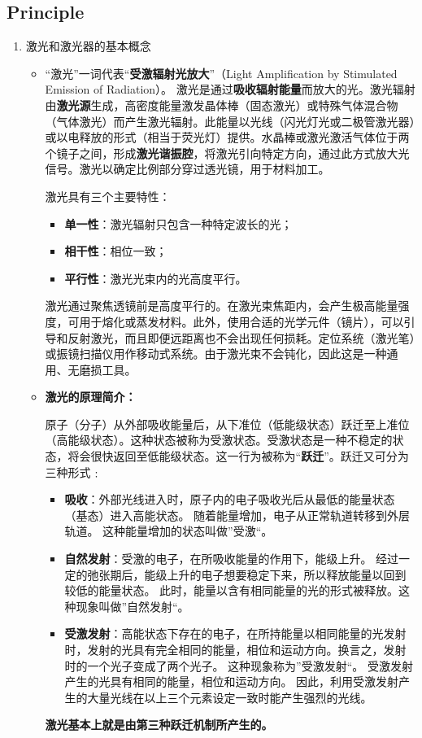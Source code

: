 \subsection{Principle}
\begin{enumerate}
	\item 激光和激光器的基本概念
	\begin{itemize}
		\item “激光”一词代表“\textbf{受激辐射光放大}”（Light Amplification by Stimulated Emission of Radiation）。   激光是通过\textbf{吸收辐射能量}而放大的光。激光辐射由\textbf{激光源}生成，高密度能量激发晶体棒（固态激光）或特殊气体混合物（气体激光）而产生激光辐射。此能量以光线（闪光灯光或二极管激光器）或以电释放的形式（相当于荧光灯）提供。水晶棒或激光激活气体位于两个镜子之间，形成\textbf{激光谐振腔}，将激光引向特定方向，通过此方式放大光信号。激光以确定比例部分穿过透光镜，用于材料加工。
		
		激光具有三个主要特性：
		\begin{itemize}
			\item \textbf{单一性}：激光辐射只包含一种特定波长的光；
			\item \textbf{相干性}：相位一致；
			\item \textbf{平行性}：激光光束内的光高度平行。
		\end{itemize}
		激光通过聚焦透镜前是高度平行的。在激光束焦距内，会产生极高能量强度，可用于熔化或蒸发材料。此外，使用合适的光学元件（镜片），可以引导和反射激光，而且即便远距离也不会出现任何损耗。定位系统（激光笔）或振镜扫描仪用作移动式系统。由于激光束不会钝化，因此这是一种通用、无磨损工具。
		
		\item \textbf{激光的原理简介：}
		
		原子（分子）从外部吸收能量后，从下准位（低能级状态）跃迁至上准位（高能级状态）。这种状态被称为受激状态。受激状态是一种不稳定的状态，将会很快返回至低能级状态。这一行为被称为“\textbf{跃迁}”。跃迁又可分为三种形式﹕
		\begin{itemize}
			\item \textbf{吸收}：外部光线进入时，原子内的电子吸收光后从最低的能量状态（基态）进入高能状态。 随着能量增加，电子从正常轨道转移到外层轨道。 这种能量增加的状态叫做”受激“。
			\item \textbf{自然发射}：受激的电子，在所吸收能量的作用下，能级上升。 经过一定的弛张期后，能级上升的电子想要稳定下来，所以释放能量以回到较低的能量状态。 此时，能量以含有相同能量的光的形式被释放。这种现象叫做”自然发射“。
			\item \textbf{受激发射}：高能状态下存在的电子，在所持能量以相同能量的光发射时，发射的光具有完全相同的能量，相位和运动方向。换言之，发射时的一个光子变成了两个光子。 这种现象称为”受激发射“。 受激发射产生的光具有相同的能量，相位和运动方向。 因此，利用受激发射产生的大量光线在以上三个元素设定一致时能产生强烈的光线。
		\end{itemize}
		\textbf{激光基本上就是由第三种跃迁机制所产生的。}
		

\end{itemize}
\end{enumerate}
